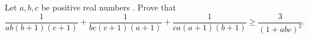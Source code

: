 Let $a,b,c$ be positive real numbers . Prove that$$ \frac{1}{ab(b+1)(c+1)}+\frac{1}{bc(c+1)(a+1)}+\frac{1}{ca(a+1)(b+1)}\geq\frac{3}{(1+abc)^2}.$$